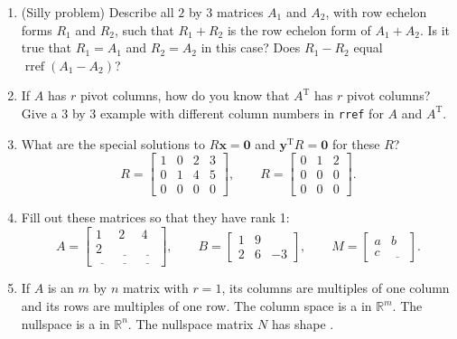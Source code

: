 \documentclass[14pt, a4paper]{article}
\begin{document}
\begin{enumerate}[resume]
    \item (Silly problem) Describe all $2$ by $3$ matrices $A_1$ and $A_2$, with row echelon forms $R_1$ and $R_2$, such that $R_1 + R_2$ is the row echelon form of $A_1 + A_2$. Is it true that $R_1 = A_1$ and $R_2 = A_2$ in this case? Does $R_1 - R_2$ equal $\operatorname{rref}(A_1 - A_2)$?

    \item If $A$ has $r$ pivot columns, how do you know that $A^{\mathrm{T}}$ has $r$ pivot columns? Give a $3$ by $3$ example with different column numbers in \texttt{rref} for $A$ and $A^{\mathrm{T}}$.

    \item What are the special solutions to $R\mathbf{x} = \mathbf{0}$ and $\mathbf{y}^{\mathrm{T}} R = \mathbf{0}$ for these $R$?
          \[
              R = \begin{bmatrix} 1 & 0 & 2 & 3 \\ 0 & 1 & 4 & 5 \\ 0 & 0 & 0 & 0 \end{bmatrix}, \qquad
              R = \begin{bmatrix} 0 & 1 & 2 \\ 0 & 0 & 0 \\ 0 & 0 & 0 \end{bmatrix}.
          \]

    \item Fill out these matrices so that they have rank 1:
          \[
              A = \begin{bmatrix} 1 & 2 & 4 \\ 2 & \underline{\hspace{1em}} & \underline{\hspace{1em}} \\ \underline{\hspace{1em}} & \underline{\hspace{1em}} & \underline{\hspace{1em}} \end{bmatrix}, \qquad
              B = \begin{bmatrix} 1 & 9 \\ 2 & 6 & -3 \end{bmatrix}, \qquad
              M = \begin{bmatrix} a & b \\ c & \underline{\hspace{1em}} \end{bmatrix}.
          \]

    \item If $A$ is an $m$ by $n$ matrix with $r=1$, its columns are multiples of one column and its rows are multiples of one row. The column space is a \underline{\hspace{2cm}} in $\mathbb{R}^m$. The nullspace is a \underline{\hspace{2cm}} in $\mathbb{R}^n$. The nullspace matrix $N$ has shape \underline{\hspace{2cm}}.


\end{enumerate}
\end{document}
